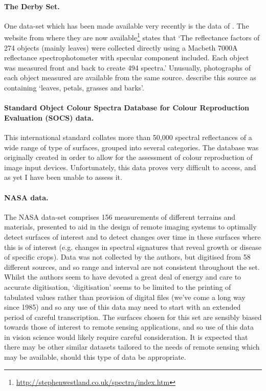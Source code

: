 \paragraph{The Derby Set.}
One data-set which has been made available very recently is the data of \citet{cheung_colour_2000}. The website from where they are now available\footnote{\url{http://stephenwestland.co.uk/spectra/index.htm}} states that `The reflectance factors of 274 objects (mainly leaves) were collected directly using a Macbeth 7000A reflectance spectrophotometer with specular component included. Each object was measured front and back to create 494 spectra.' Unusually, photographs of each object measured are available from the same source. \citet{cheung_color_2004} describe this source as containing `leaves, petals, grasses and barks'.

\paragraph{Standard Object Colour Spectra Database for Colour Reproduction Evaluation (SOCS) data.}
This international standard \citep{tajima_development_1998,iso/tc_130_graphic_technology_iso/tr_2003} collates more than 50,000 spectral reflectances of a wide range of type of surfaces, grouped into several categories. The database was originally created in order to allow for the assessment of colour reproduction of image input devices. Unfortunately, this data proves very difficult to access, and as yet I have been unable to assess it.

\paragraph{NASA data.}
The NASA data-set \citep{david_e._bowker_spectral_1985} comprises 156 measurements of different terrains and materials, presented to aid in the design of remote imaging systems to optimally detect surfaces of interest and to detect changes over time in these surfaces where this is of interest (e.g. changes in spectral signatures that reveal growth or disease of specific crops). Data was not collected by the authors, but digitised from 58 different sources, and so range and interval are not consistent throughout the set. Whilst the authors seem to have devoted a great deal of energy and care to accurate digitisation, `digitisation' seems to be limited to the printing of tabulated values rather than provision of digital files (we've come a long way since 1985) and so any use of this data may need to start with an extended period of careful transcription. The surfaces chosen for this set are sensibly biased towards those of interest to remote sensing applications, and so use of this data in vision science would likely require careful consideration. It is expected that there may be other similar datasets tailored to the needs of remote sensing which may be available, should this type of data be appropriate.

